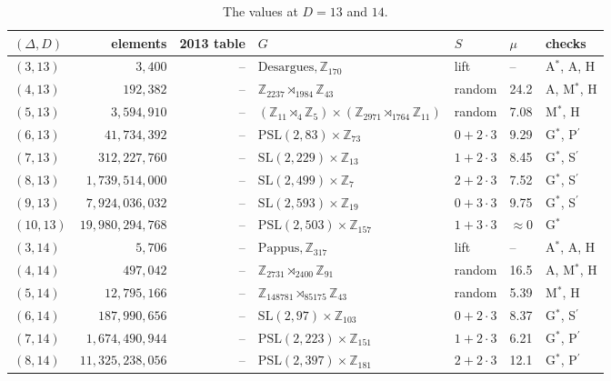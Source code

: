 \documentclass[11pt]{amsart}
\theoremstyle{definition}
\theoremstyle{remark}
\begin{document}
\begin{table}[ht]
\centering\scriptsize
\setlength{\tabcolsep}{3.5pt}
\begin{tabular}{@{}lrr>{\raggedright}p{}llp{}@{}}
\toprule
$(\Delta,D)$ & elements & 2013 table & $G$ & $S$ & $\mu$ & checks\\
\midrule
$(3,13)$ & $3{,}400$ & -- & $\text{Desargues}, \mathbb{Z}_{170}$ & lift & -- & A$^\ast$, A, H\\
$(4,13)$ & $192{,}382$ & -- & $\mathbb{Z}_{2237}\rtimes_{1984}\mathbb{Z}_{43}$ & random & 24.2 & A, M$^\ast$, H\\
$(5,13)$ & $3{,}594{,}910$ & -- & $(\mathbb{Z}_{11}\rtimes_4\mathbb{Z}_5)\times(\mathbb{Z}_{2971}\rtimes_{1764}\mathbb{Z}_{11})$ & random & 7.08 & M$^\ast$, H\\
$(6,13)$ & $41{,}734{,}392$ & -- & $\mathrm{PSL}(2,83)\times\mathbb{Z}_{73}$ & $0+2\cdot3$ & 9.29 & G$^\ast$, P$^\prime$\\
$(7,13)$ & $312{,}227{,}760$ & -- & $\mathrm{SL}(2,229)\times\mathbb{Z}_{13}$ & $1+2\cdot3$ & 8.45 & G$^\ast$, S$^\prime$\\
$(8,13)$ & $1{,}739{,}514{,}000$ & -- & $\mathrm{SL}(2,499)\times\mathbb{Z}_{7}$ & $2+2\cdot3$ & 7.52 & G$^\ast$, S$^\prime$\\
$(9,13)$ & $7{,}924{,}036{,}032$ & -- & $\mathrm{SL}(2,593)\times\mathbb{Z}_{19}$ & $0+3\cdot3$ & 9.75 & G$^\ast$, S$^\prime$\\
$(10,13)$ & $19{,}980{,}294{,}768$ & -- & $\mathrm{PSL}(2,503)\times\mathbb{Z}_{157}$ & $1+3\cdot3$ & $\approx0$ & G$^\ast$\\
$(3,14)$ & $5{,}706$ & -- & $\text{Pappus}, \mathbb{Z}_{317}$ & lift & -- & A$^\ast$, A, H\\
$(4,14)$ & $497{,}042$ & -- & $\mathbb{Z}_{2731}\rtimes_{2400}\mathbb{Z}_{91}$ & random & 16.5 & A, M$^\ast$, H\\
$(5,14)$ & $12{,}795{,}166$ & -- & $\mathbb{Z}_{148781}\rtimes_{85175}\mathbb{Z}_{43}$ & random & 5.39 & M$^\ast$, H\\
$(6,14)$ & $187{,}990{,}656$ & -- & $\mathrm{SL}(2,97)\times\mathbb{Z}_{103}$ & $0+2\cdot3$ & 8.37 & G$^\ast$, S$^\prime$\\
$(7,14)$ & $1{,}674{,}490{,}944$ & -- & $\mathrm{PSL}(2,223)\times\mathbb{Z}_{151}$ & $1+2\cdot3$ & 6.21 & G$^\ast$, P$^\prime$\\
$(8,14)$ & $11{,}325{,}238{,}056$ & -- & $\mathrm{PSL}(2,397)\times\mathbb{Z}_{181}$ & $2+2\cdot3$ & 12.1 & G$^\ast$, P$^\prime$\\
\bottomrule
\end{tabular}
\caption{The values at $D=13$ and $14$.}
\label{tab:haar1314}
\end{table}
\end{document}

